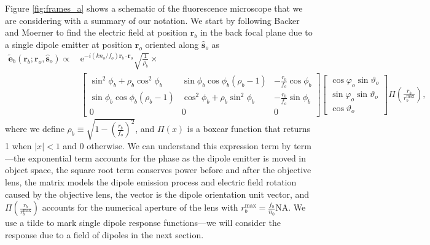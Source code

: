 \documentclass[11pt]{article}
\newcommand{\me}{\mathrm{e}}
\providecommand{\mb}[1]{\mathbf{#1}}
\providecommand{\ro}[1]{\mathbf{\mathbf{r}}_o}
\providecommand{\so}[1]{\mathbf{\hat{s}}_o}
\providecommand{\rb}[1]{\mathbf{r}_b}
\begin{document}
Figure \ref{fig:frames_a} shows a schematic of the fluorescence microscope that
we are considering with a summary of our notation. We start by following Backer
and Moerner \cite{backer2014} to find the electric field at position $\rb{}$ in
the back focal plane due to a single dipole emitter at position $\ro{}$ oriented
along $\so{}$ as
\begin{align}
  \mb{\tilde{e}}_b(\rb{};\ro{}, \so{}) \propto\, &\me^{-i(kn_o/f_o)\rb{}\cdot\ro{}}\sqrt{\frac{1}{\rho_b}} \times \nonumber \\
  &\begin{bmatrix}
    \sin^2\phi_b + \rho_b\cos^2\phi_b&\sin\phi_b\cos\phi_b(\rho_b - 1)&-\frac{r_b}{f_o}\cos\phi_b\\
    \sin\phi_b\cos\phi_b(\rho_b - 1)&\cos^2\phi_b + \rho_b\sin^2\phi_b&-\frac{r_b}{f_o}\sin\phi_b\\
    0&0&0
  \end{bmatrix}
  \begin{bmatrix}
    \cos\varphi_o\sin\vartheta_o\\
    \sin\varphi_o\sin\vartheta_o\\
    \cos\vartheta_o
  \end{bmatrix}
\Pi\left(\frac{r_b}{r_b^{\text{max}}}\right)\label{eq:bfp},
\end{align}
where we define $\rho_b \equiv \sqrt{1 - \left(\frac{r_b}{f_o}\right)^2}$, and
$\Pi(x)$ is a boxcar function that returns 1 when $|x| < 1$ and 0 otherwise. We
can understand this expression term by term---the exponential term accounts for
the phase as the dipole emitter is moved in object space, the square root term
conserves power before and after the objective lens, the matrix models the
dipole emission process and electric field rotation caused by the objective
lens, the vector is the dipole orientation unit vector, and
$\Pi\left(\frac{r_b}{r_b^{\text{max}}}\right)$ accounts for the numerical
aperture of the lens with $r_b^{\text{max}} = \frac{f_0}{n_0}\text{NA}$. We use
a tilde to mark single dipole response functions---we will consider the response
due to a field of dipoles in the next section.
\end{document}
